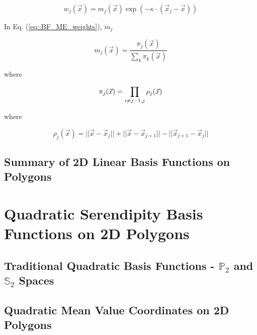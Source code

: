 \begin{equation}
\label{eq::BF_ME_weights}
w_j (\vec{x})  = m_j(\vec{x}) \exp(-  \kappa \cdot (\vec{x}_j - \vec{x}))
\end{equation}

\noindent In Eq. (\ref{eq::BF_ME_weights}), $m_j$ 

\begin{equation}
\label{eq::BF_ME_prior_funcs}
 m_j(\vec{x}) = \frac{\pi_j (\vec{x}) }{\sum_{k} \pi_k (\vec{x})}
\end{equation}

\noindent where

\begin{equation}
\label{eq::BF_ME_prior_products}
\pi_j (\vec{x}) = \prod\displaylimits_{i \neq j-1, j} \rho_j (\vec{x})
\end{equation}

\noindent where

\begin{equation}
\label{eq::BF_ME_face_funcs}
\rho_j (\vec{x}) = || \vec{x} - \vec{x}_j || + || \vec{x} - \vec{x}_{j+1} || - || \vec{x}_{j+1} - \vec{x}_j ||
\end{equation}

\subsection{Summary of 2D Linear Basis Functions on Polygons}
\label{sec::BF_2DLinear_Summary}



\section{Quadratic Serendipity Basis Functions on 2D Polygons}
\label{sec::BF_2DQuadratic}

\subsection{Traditional Quadratic Basis Functions - $\mathbb{P}_{2}$ and $\mathbb{S}_{2}$ Spaces}
\label{sec::BF_2DQuadratic_P2S2}


\subsection{Quadratic Mean Value Coordinates on 2D Polygons}
\label{sec::BF_2DQuadratic_ME}


